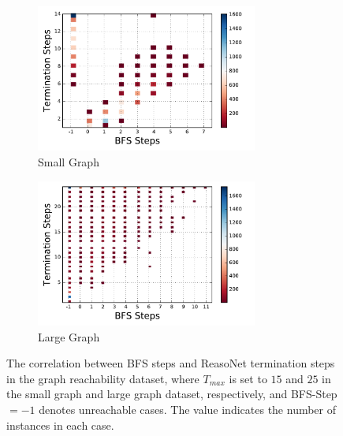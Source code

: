 \documentclass[sigconf]{acmart}
\begin{document}
\begin{figure}[t]
	\centering
	\begin{subfigure}{.41\textwidth}
		\centering
		\includegraphics[width=0.8\textwidth]{figure/small_correlation}
			\vspace{-1mm}
		\caption{Small Graph}
	\end{subfigure}
	\begin{subfigure}{.41\textwidth}
		\centering
		\includegraphics[width=0.8\textwidth]{figure/large_correlation}
	\vspace{-1mm}
		\caption{Large Graph}
	\end{subfigure}
	\vspace{-1mm}
	\caption{{The correlation between BFS steps and ReasoNet termination steps in the graph reachability dataset, where  $T_{max}$ is set to $15$ and $25$ in the small graph and large graph dataset, respectively, and BFS-Step$ =-1$ denotes unreachable cases. The value indicates the number of instances in each case.}}
	\label{fig:graph_termination_bfs_correlation}
\end{figure}

\end{document}

